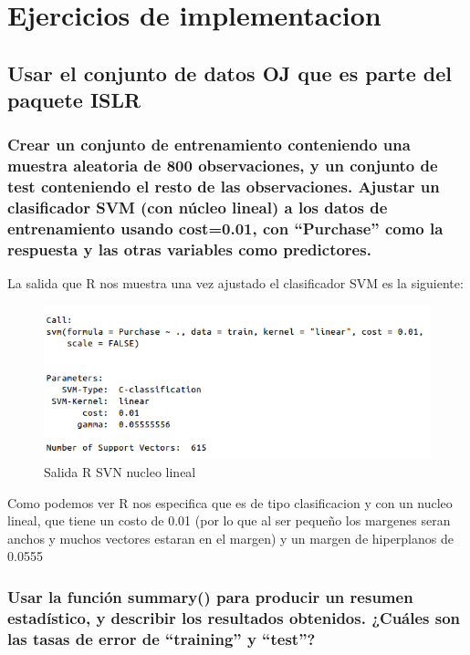 \section{Ejercicios de implementacion}

\subsection{Usar el conjunto de datos OJ que es parte del paquete ISLR}

\subsubsection{Crear un conjunto de entrenamiento conteniendo una muestra aleatoria de 800 observaciones, y un conjunto de test conteniendo el resto de las observaciones. Ajustar un clasificador SVM (con núcleo lineal) a los datos de entrenamiento usando cost=0.01, con “Purchase” como la respuesta y las otras variables como predictores.}

La salida que R nos muestra una vez ajustado el clasificador SVM es la siguiente:

\begin{figure}[H]
\centering
\includegraphics[scale=0.60]{ej1-1.png}
\caption{Salida R SVN nucleo lineal}
\label{}
\end{figure}

Como podemos ver R nos especifica que es de tipo clasificacion y con un nucleo lineal, que tiene un costo de 0.01 (por lo que al ser pequeño los margenes seran anchos y muchos vectores estaran en el margen) y un margen de hiperplanos de 0.0555

\subsubsection{Usar la función summary() para producir un resumen estadístico, y describir los resultados obtenidos. ¿Cuáles son las tasas de error de “training” y “test”?}

